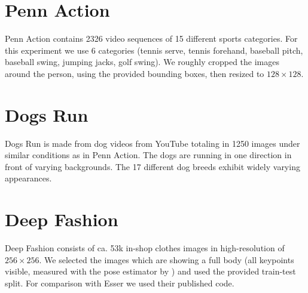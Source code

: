 \section*{Penn Action}{Penn Action} \cite{zhang13penn} contains 2326 video sequences of 15 different sports categories.
For this experiment we use 6 categories (tennis serve, tennis forehand, baseball pitch, baseball swing, jumping jacks, golf swing).
We roughly cropped the images around the person, using the provided bounding boxes, then resized to $128\times128$.


\section*{Dogs Run}{Dogs Run} is made from dog videos from YouTube totaling in 1250 images under similar conditions as in Penn Action. The dogs are running in one direction in front of varying backgrounds. The 17 different dog breeds exhibit widely varying appearances.


\section*{Deep Fashion}{Deep Fashion} \cite{liu16deepfashion, liu16deepfashionwild} consists of ca. 53k in-shop clothes images in high-resolution of $256 \times 256$. We selected the images which are showing a full body (all keypoints visible, measured with the pose estimator by \cite{cao17affinityfield}) and used the provided train-test split.
For comparison with Esser \etal \cite{esser18} we used their published code.


